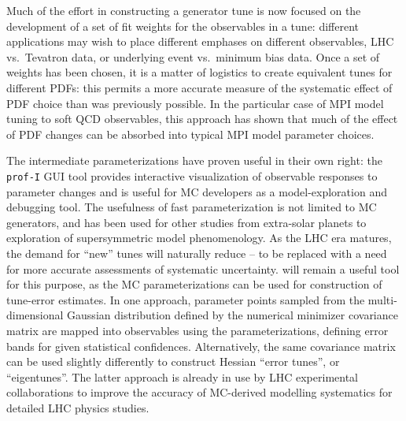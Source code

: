 Much of the effort in constructing a generator tune is now focused on the
development of a set of fit weights for the observables in a tune: different
applications may wish to place different emphases on different observables,
\eg LHC vs.\ Tevatron data, or underlying event vs.\ minimum bias data. Once a
set of weights has been chosen, it is a matter of logistics to create equivalent
tunes for different PDFs: this permits a more accurate measure of the systematic
effect of PDF choice than was previously possible. In the particular case of MPI
model tuning to soft QCD observables, this approach has shown that much of the
effect of PDF changes can be absorbed into typical MPI model parameter
choices.

The intermediate parameterizations have proven useful in their own right: the
\texttt{prof-I} GUI tool provides interactive visualization of observable
responses to parameter changes and is useful for MC developers as a
model-exploration and debugging tool. The usefulness of fast parameterization is
not limited to MC generators, and \professor has been used for other studies
from extra-solar planets to exploration of supersymmetric model phenomenology.
As the LHC era matures, the demand for ``new'' tunes will naturally reduce -- to
be replaced with a need for more accurate assessments of systematic
uncertainty. \professor will remain a useful tool for this purpose, as the MC
parameterizations can be used for construction of tune-error estimates. In one
approach, parameter points sampled from the multi-dimensional Gaussian
distribution defined by the numerical minimizer covariance matrix are mapped
into observables using the parameterizations, defining error bands for given
statistical confidences. Alternatively, the same covariance matrix can be used
slightly differently to construct Hessian ``error tunes'', or
``eigentunes''. The latter approach is already in use by LHC experimental
collaborations to improve the accuracy of MC-derived modelling systematics for
detailed LHC physics studies.


